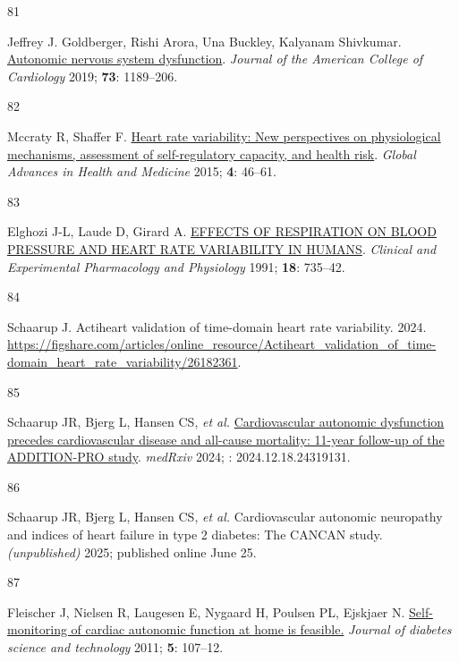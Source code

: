 \documentclass[
  letterpaper,
  headsepline=true,
  open=any]{scrbook}
\newlength{\cslhangindent}
\newlength{\csllabelwidth}
\newlength{\cslentryspacingunit} %
\newenvironment{CSLReferences}[2] %
 {%
  \setlength{\parindent}{0pt}
  \ifodd #1
  \let\oldpar\par
  \def\par{\hangindent=\cslhangindent\oldpar}
  \fi
  \setlength{\parskip}{#2\cslentryspacingunit}
 }%
 {}
\newcommand{\CSLLeftMargin}[1]{\parbox[t]{\csllabelwidth}{#1}}
\newcommand{\CSLRightInline}[1]{\parbox[t]{\linewidth - \csllabelwidth}{#1}\break}
\begin{document}
\begin{CSLReferences}{0}{0}
\leavevmode{}%
\CSLLeftMargin{81 }%
\CSLRightInline{Jeffrey J. Goldberger, Rishi Arora, Una Buckley,
Kalyanam Shivkumar.
\href{https://doi.org/doi:10.1016/j.jacc.2018.12.064}{Autonomic nervous
system dysfunction}. \emph{Journal of the American College of
Cardiology} 2019; \textbf{73}: 1189--206.}

\leavevmode{}%
\CSLLeftMargin{82 }%
\CSLRightInline{Mccraty R, Shaffer F.
\href{https://doi.org/10.7453/gahmj.2014.073}{Heart rate variability:
New perspectives on physiological mechanisms, assessment of
self-regulatory capacity, and health risk}. \emph{Global Advances in
Health and Medicine} 2015; \textbf{4}: 46--61.}

\leavevmode{}%
\CSLLeftMargin{83 }%
\CSLRightInline{Elghozi J-L, Laude D, Girard A.
\href{https://doi.org/10.1111/j.1440-1681.1991.tb01391.x}{EFFECTS OF
RESPIRATION ON BLOOD PRESSURE AND HEART RATE VARIABILITY IN HUMANS}.
\emph{Clinical and Experimental Pharmacology and Physiology} 1991;
\textbf{18}: 735--42.}

\leavevmode{}%
\CSLLeftMargin{84 }%
\CSLRightInline{Schaarup J. Actiheart validation of time-domain heart
rate variability. 2024.
\url{https://figshare.com/articles/online_resource/Actiheart_validation_of_time-domain_heart_rate_variability/26182361}.}

\leavevmode{}%
\CSLLeftMargin{85 }%
\CSLRightInline{Schaarup JR, Bjerg L, Hansen CS, \emph{et al.}
\href{https://doi.org/10.1101/2024.12.18.24319131}{Cardiovascular
autonomic dysfunction precedes cardiovascular disease and all-cause
mortality: 11-year follow-up of the ADDITION-PRO study}. \emph{medRxiv}
2024; : 2024.12.18.24319131.}

\leavevmode{}%
\CSLLeftMargin{86 }%
\CSLRightInline{Schaarup JR, Bjerg L, Hansen CS, \emph{et al.}
Cardiovascular autonomic neuropathy and indices of heart failure in type
2 diabetes: The CANCAN study. \emph{(unpublished)} 2025; published
online June 25.}

\leavevmode{}%
\CSLLeftMargin{87 }%
\CSLRightInline{Fleischer J, Nielsen R, Laugesen E, Nygaard H, Poulsen
PL, Ejskjaer N.
\href{https://doi.org/10.1177/193229681100500115}{Self-monitoring of
cardiac autonomic function at home is feasible.} \emph{Journal of
diabetes science and technology} 2011; \textbf{5}: 107--12.}


\end{CSLReferences}
\end{document}
